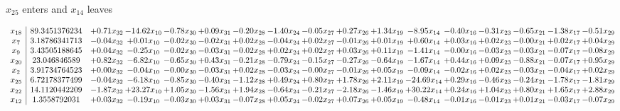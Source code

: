 \documentclass[9pt]{article}
\begin{document}
 $ x_{25} $ enters and $ x_{14} $ leaves 

 \[\begin{array}{c| c c@{\hskip 2pt} c@{\hskip 2pt} c@{\hskip 2pt} c@{\hskip 2pt} c@{\hskip 2pt} c@{\hskip 2pt} c@{\hskip 2pt} c@{\hskip 2pt} c@{\hskip 2pt} c@{\hskip 2pt} c@{\hskip 2pt} c@{\hskip 2pt} c@{\hskip 2pt} c@{\hskip 2pt} c@{\hskip 2pt} }
 x_{18}   &  89.3451376234 & +  0.71 x_{32} & -14.62 x_{10} & -0.78 x_{30} & +  0.09 x_{31} & -0.20 x_{28} & -1.40 x_{24} & -0.05 x_{27} & +  0.27 x_{26} & +  1.34 x_{19} & -8.95 x_{14} & -0.40 x_{16} & -0.31 x_{23} & -0.65 x_{21} & -1.38 x_{17} & -0.51 x_{29}\\
 x_{7}   &  3.18786341713 & -0.04 x_{32} & +  0.01 x_{10} & -0.02 x_{30} & -0.02 x_{31} & +  0.02 x_{28} & -0.04 x_{24} & +  0.02 x_{27} & -0.01 x_{26} & +  0.01 x_{19} & +  0.60 x_{14} & +  0.03 x_{16} & +  0.02 x_{23} & -0.00 x_{21} & +  0.02 x_{17} & +  0.04 x_{29}\\
 x_{9}   &  3.43505188645 & +  0.04 x_{32} & -0.25 x_{10} & -0.02 x_{30} & -0.03 x_{31} & -0.02 x_{28} & +  0.02 x_{24} & +  0.02 x_{27} & +  0.03 x_{26} & +  0.11 x_{19} & -1.41 x_{14} & -0.00 x_{16} & -0.03 x_{23} & -0.03 x_{21} & -0.07 x_{17} & -0.08 x_{29}\\
 x_{20}   &  23.046846589 & +  0.82 x_{32} & -6.82 x_{10} & -0.65 x_{30} & +  0.43 x_{31} & -0.21 x_{28} & -0.79 x_{24} & -0.15 x_{27} & -0.27 x_{26} & -0.64 x_{19} & -1.67 x_{14} & +  0.44 x_{16} & +  0.09 x_{23} & -0.88 x_{21} & -0.07 x_{17} & +  0.95 x_{29}\\
 x_{2}   &  3.91734764523 & +  0.00 x_{32} & -0.04 x_{10} & -0.00 x_{30} & -0.03 x_{31} & +  0.02 x_{28} & -0.03 x_{24} & -0.00 x_{27} & -0.01 x_{26} & +  0.05 x_{19} & -0.09 x_{14} & -0.02 x_{16} & +  0.02 x_{23} & -0.03 x_{21} & -0.04 x_{17} & +  0.02 x_{29}\\
 x_{25}   &  6.72178377499 & -0.04 x_{32} & -6.18 x_{10} & -0.85 x_{30} & -0.40 x_{31} & -1.12 x_{28} & +  0.49 x_{24} & +  0.80 x_{27} & +  1.78 x_{26} & +  2.11 x_{19} & -24.69 x_{14} & +  0.29 x_{16} & -0.46 x_{23} & -0.24 x_{21} & -1.78 x_{17} & -1.81 x_{29}\\
 x_{22}   &  14.1120442209 & -1.87 x_{32} & + 23.27 x_{10} & +  1.05 x_{30} & -1.56 x_{31} & +  1.94 x_{28} & -0.64 x_{24} & -0.21 x_{27} & -2.18 x_{26} & -1.46 x_{19} & + 30.22 x_{14} & +  0.24 x_{16} & +  1.04 x_{23} & +  0.80 x_{21} & +  1.65 x_{17} & +  2.88 x_{29}\\
 x_{12}   &  1.3558792031 & +  0.03 x_{32} & -0.19 x_{10} & -0.03 x_{30} & +  0.03 x_{31} & -0.07 x_{28} & +  0.05 x_{24} & -0.02 x_{27} & +  0.07 x_{26} & +  0.05 x_{19} & -0.48 x_{14} & -0.01 x_{16} & -0.01 x_{23} & +  0.01 x_{21} & -0.03 x_{17} & -0.07 x_{29}\\

\end{array}\]
\end{document}
